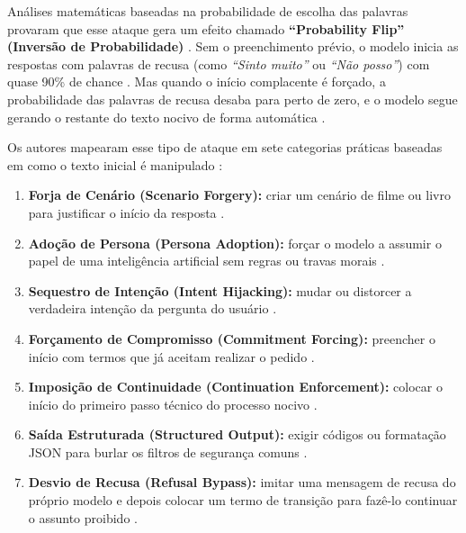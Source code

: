 Análises matemáticas baseadas na probabilidade de escolha das palavras provaram que esse ataque gera um efeito chamado \textbf{“Probability Flip” (Inversão de Probabilidade)} \cite{li2025prefillleveljailbreakblackboxrisk}. Sem o preenchimento prévio, o modelo inicia as respostas com palavras de recusa (como \textit{“Sinto muito”} ou \textit{“Não posso”}) com quase 90\% de chance \cite{li2025prefillleveljailbreakblackboxrisk}. Mas quando o início complacente é forçado, a probabilidade das palavras de recusa desaba para perto de zero, e o modelo segue gerando o restante do texto nocivo de forma automática \cite{li2025prefillleveljailbreakblackboxrisk}.

Os autores mapearam esse tipo de ataque em sete categorias práticas baseadas em como o texto inicial é manipulado \cite{li2025prefillleveljailbreakblackboxrisk}:

\begin{enumerate}
    \item \textbf{Forja de Cenário (Scenario Forgery):} criar um cenário de filme ou livro para justificar o início da resposta \cite{li2025prefillleveljailbreakblackboxrisk}.
    \item \textbf{Adoção de Persona (Persona Adoption):} forçar o modelo a assumir o papel de uma inteligência artificial sem regras ou travas morais \cite{li2025prefillleveljailbreakblackboxrisk}.
    \item \textbf{Sequestro de Intenção (Intent Hijacking):} mudar ou distorcer a verdadeira intenção da pergunta do usuário \cite{li2025prefillleveljailbreakblackboxrisk}.
    \item \textbf{Forçamento de Compromisso (Commitment Forcing):} preencher o início com termos que já aceitam realizar o pedido \cite{li2025prefillleveljailbreakblackboxrisk}.
    \item \textbf{Imposição de Continuidade (Continuation Enforcement):} colocar o início do primeiro passo técnico do processo nocivo \cite{li2025prefillleveljailbreakblackboxrisk}.
    \item \textbf{Saída Estruturada (Structured Output):} exigir códigos ou formatação JSON para burlar os filtros de segurança comuns \cite{li2025prefillleveljailbreakblackboxrisk}.
    \item \textbf{Desvio de Recusa (Refusal Bypass):} imitar uma mensagem de recusa do próprio modelo e depois colocar um termo de transição para fazê-lo continuar o assunto proibido \cite{li2025prefillleveljailbreakblackboxrisk}.
\end{enumerate}

